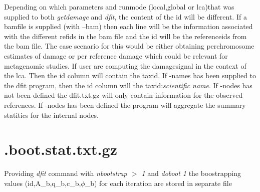\documentclass[10pt]{article}
\begin{document}
Depending on which parameters and runmode (local,global or lca)that was supplied to both
\emph{getdamage} and \emph{dfit}, the content of the id will be
different. If a bamfile is supplied (with --bam) then each line will be
the information associated with the different refids in the bam file
and the id will be the referenceids from the bam file. The case
scenario for this would be either obtaining perchromosome estimates of
damage or per reference damage which could be relevant for metagenomic
studies. If user are computing the damagesignal in the context of the
lca. Then the id column will contain the taxid. If -names has been
supplied to the dfit program, then the id column will the
taxid:\emph{scientific name}. If -nodes has not been defined the
dfit.txt.gz will only contain information for the observed
references. If -nodes has been defined the program will aggregate the
summary statitics for the internal nodes.


\section{.boot.stat.txt.gz}
Providing \textit{dfit} command with \textit{nbootstrap $>$ 1} and
\textit{doboot 1} the boostrapping values
(id,A\_b,q\_b,c\_b,$\phi$\_b) for each iteration are stored in separate file
\end{document}
